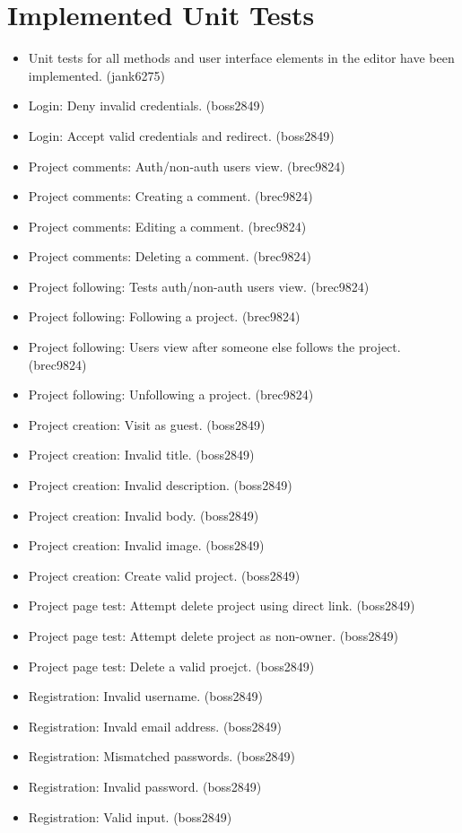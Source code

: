 \documentclass[11pt]{report}
\begin{document}
\section{Implemented Unit Tests}
    \begin{itemize}
        \item Unit tests for all methods and user interface elements in the editor have been implemented. (jank6275)
        \item Login: Deny invalid credentials. (boss2849)
        \item Login: Accept valid credentials and redirect. (boss2849)
        \item Project comments: Auth/non-auth users view. (brec9824)
        \item Project comments: Creating a comment. (brec9824)
        \item Project comments: Editing a comment. (brec9824)
        \item Project comments: Deleting a comment. (brec9824)
        \item Project following: Tests auth/non-auth users view. (brec9824)
        \item Project following: Following a project. (brec9824)
        \item Project following: Users view after someone else follows the project. (brec9824)
        \item Project following: Unfollowing a project. (brec9824)
        \item Project creation: Visit as guest. (boss2849)
        \item Project creation: Invalid title. (boss2849)
        \item Project creation: Invalid description. (boss2849)
        \item Project creation: Invalid body. (boss2849)
        \item Project creation: Invalid image. (boss2849)
        \item Project creation: Create valid project. (boss2849)
        \item Project page test: Attempt delete project using direct link. (boss2849)
        \item Project page test: Attempt delete project as non-owner. (boss2849)
        \item Project page test: Delete a valid proejct. (boss2849)
        \item Registration: Invalid username. (boss2849)
        \item Registration: Invald email address. (boss2849)
        \item Registration: Mismatched passwords. (boss2849)
        \item Registration: Invalid password. (boss2849)
        \item Registration: Valid input. (boss2849)
    \end{itemize}
\end{document}
